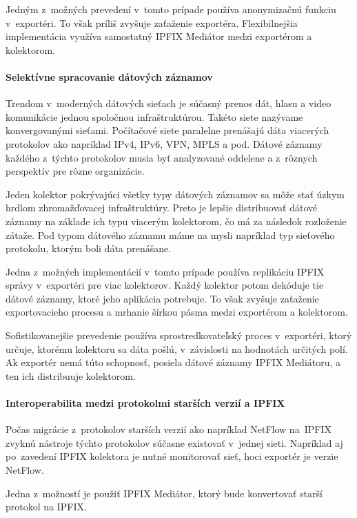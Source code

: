 Jedným z~možných prevedení v~tomto prípade používa anonymizačnú funkciu v~exportéri. 
To však príliš zvyšuje zaťaženie exportéra. Flexibilnejšia implementácia využíva samostatný 
IPFIX Mediátor medzi exportérom a kolektorom.


\paragraph{Selektívne spracovanie dátových záznamov}

Trendom v~moderných dátových sieťach je súčasný prenos dát, hlasu a video komunikácie jednou 
spoločnou infraštruktúrou. Takéto siete nazývame konvergovanými sieťami. 
Počítačové siete paralelne prenášajú dáta viacerých protokolov ako napríklad
IPv4, IPv6, VPN, MPLS a pod. Dátové záznamy každého z~týchto protokolov musia byť analyzované 
oddelene a z~rôznych perspektív pre rôzne organizácie.

Jeden kolektor pokrývajúci všetky typy dátových záznamov sa môže stať úzkym hrdlom 
zhromažďovacej infraštruktúry. Preto je lepšie distribuovať dátové záznamy na základe ich 
typu viacerým kolektorom, čo má za následok rozloženie zátaže. Pod typom dátového 
záznamu máme na mysli napríklad typ sieťového protokolu, ktorým boli dáta prenášane. 

Jedna z~možných implementácií v~tomto prípade používa replikáciu IPFIX správy v~exportéri 
pre viac kolektorov. Každý kolektor potom dekóduje tie dátové záznamy, ktoré jeho aplikácia
potrebuje. To však zvyšuje zaťaženie exportovacieho procesu a mrhanie šírkou pásma medzi
exportérom a kolektorom.

Sofistikovanejšie prevedenie používa sprostredkovateľský proces v~exportéri, ktorý určuje, 
ktorému kolektoru sa dáta pošlú, v~závislosti na hodnotách určitých polí. Ak exportér nemá
túto schopnosť, posiela dátové záznamy IPFIX Mediátoru, a ten ich distribuuje kolektorom.


\paragraph{Interoperabilita medzi protokolmi starších verzií a IPFIX}

Počas migrácie z~protokolov starších verzií ako napríklad NetFlow \citep{rfc3954} na~IPFIX
zvyknú nástroje týchto protokolov súčasne existovať v~jednej sieti. Napríklad aj po~zavedení 
IPFIX kolektora je nutné monitorovať sieť, hoci exportér je verzie NetFlow.

Jedna z~možností je použiť IPFIX Mediátor, ktorý bude konvertovať starší protokol na IPFIX.

